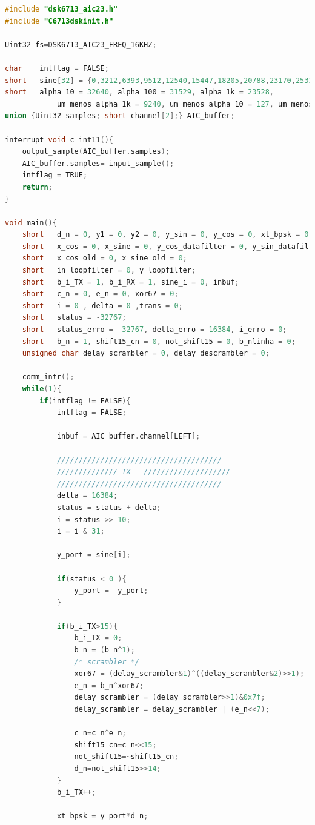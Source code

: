 \documentclass[11pt]{article}
\numberwithin{equation}{section}
\begin{document}
\begin{lstlisting}[language=C]
#include "dsk6713_aic23.h"
#include "C6713dskinit.h"

Uint32 fs=DSK6713_AIC23_FREQ_16KHZ;

char	intflag = FALSE;
short	sine[32] = {0,3212,6393,9512,12540,15447,18205,20788,23170,25330,27246,28899,30274,31357,		32138,32610,32767,32610,32138,31357,30274,28899,27246,25330,23170,20788,18205,	15447,12540,9512,6393,3212}; 
short	alpha_10 = 32640, alpha_100 = 31529, alpha_1k = 23528, 
			um_menos_alpha_1k = 9240, um_menos_alpha_10 = 127, um_menos_alpha_100 = 1238;
union {Uint32 samples; short channel[2];} AIC_buffer;

interrupt void c_int11(){
	output_sample(AIC_buffer.samples);   
	AIC_buffer.samples= input_sample(); 	   
	intflag = TRUE;
	return;
}

void main(){
	short	d_n = 0, y1 = 0, y2 = 0, y_sin = 0, y_cos = 0, xt_bpsk = 0, y_port = 0;
	short	x_cos = 0, x_sine = 0, y_cos_datafilter = 0, y_sin_datafilter = 0;
	short	x_cos_old = 0, x_sine_old = 0;
	short	in_loopfilter = 0, y_loopfilter;
	short	b_i_TX = 1, b_i_RX = 1, sine_i = 0, inbuf;
	short	c_n = 0, e_n = 0, xor67 = 0;
	short 	i = 0 , delta = 0 ,trans = 0;
	short	status = -32767;
	short	status_erro = -32767, delta_erro = 16384, i_erro = 0;
	short	b_n = 1, shift15_cn = 0, not_shift15 = 0, b_nlinha = 0;
	unsigned char delay_scrambler = 0, delay_descrambler = 0;
	
	comm_intr();                   
	while(1){                	   	
		if(intflag != FALSE){
			intflag = FALSE;
			
			inbuf = AIC_buffer.channel[LEFT];
			
			//////////////////////////////////////
			////////////// TX	////////////////////
			//////////////////////////////////////
			delta = 16384;
			status = status + delta;
			i = status >> 10;
			i = i & 31;
			
			y_port = sine[i];
			
			if(status < 0 ){
				y_port = -y_port;
			}
			
			if(b_i_TX>15){
				b_i_TX = 0;
				b_n = (b_n^1);
				/* scrambler */
				xor67 = (delay_scrambler&1)^((delay_scrambler&2)>>1);
				e_n = b_n^xor67;
				delay_scrambler = (delay_scrambler>>1)&0x7f;
				delay_scrambler = delay_scrambler | (e_n<<7);
				
				c_n=c_n^e_n;
				shift15_cn=c_n<<15;
				not_shift15=~shift15_cn;
				d_n=not_shift15>>14;
			}
			b_i_TX++;
			
			xt_bpsk = y_port*d_n;
			

\end{lstlisting}
\end{document}
